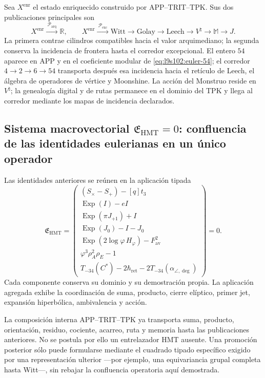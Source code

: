Sea \(X^{\mathrm{enr}}\) el estado enriquecido construido por
APP--TRIT--TPK. Sus dos publicaciones principales son
\begin{equation}
 X^{\mathrm{enr}}
 \xrightarrow{\ \mathcal P_{\mathrm{arq}}\ }\mathbb R,
 \qquad
 X^{\mathrm{enr}}
 \xrightarrow{\ \mathcal P_{\mathrm{exc}}\ }
 \mathrm{Witt}\to\mathrm{Golay}\to\mathrm{Leech}
 \to V^\natural\to\mathbb M\to J.
 \label{eq:l9s102:euler-doble-proyeccion}
\end{equation}
La primera contrae cilindros compatibles hacia el valor arquimediano; la
segunda conserva la incidencia de frontera hasta el corredor excepcional.
El entero \(54\) aparece en APP y en el coeficiente modular de
\cref{eq:l9s102:euler-54}; el corredor \(4\to2\to6\to54\) transporta
después esa incidencia hacia el retículo de Leech, el álgebra de operadores
de vértice y Moonshine. La acción del Monstruo reside en
\(V^\natural\); la genealogía digital y de rutas permanece en el dominio
del TPK y llega al corredor mediante los mapas de incidencia declarados.

\subsection{Sistema macrovectorial \texorpdfstring{\(\mathfrak E_{\mathrm{HMT}}=0\)}{E_HMT=0}: confluencia de las identidades eulerianas en un único operador}
\label{sec:l9s102:euler-macrovector}

Las identidades anteriores se reúnen en la aplicación tipada
\begin{equation}
 \boxed{
 \mathfrak E_{\mathrm{HMT}}=
 \begin{pmatrix}
 (S_\times-S_+)-[q]t_3\\[1mm]
 \operatorname{Exp}(I)-eI\\
 \operatorname{Exp}(\pi J_{+1})+I\\
 \operatorname{Exp}(J_0)-I-J_0\\
 \operatorname{Exp}(2\log\varphi\,H_\varphi)-F_{\mathrm{av}}^2\\
 \varphi^3\rho_A^2\rho_E-1\\
 T_{-34}(C^*)-2\hbar_{\mathrm{ret}}
 -2T_{-34}(\alpha_{\angle,\deg})
 \end{pmatrix}=0.}
 \label{eq:l9s102:euler-macrovector}
\end{equation}
Cada componente conserva su dominio y su demostración propia. La aplicación
agregada exhibe la coordinación de suma, producto, cierre elíptico, primer
jet, expansión hiperbólica, ambivalencia y acción.

La composición interna APP--TRIT--TPK ya transporta suma, producto,
orientación, residuo, cociente, acarreo, ruta y memoria hasta las
publicaciones anteriores. No se postula por ello un entrelazador HMT
ausente. Una promoción posterior sólo puede formularse mediante el cuadrado
tipado específico exigido por una representación ulterior ---por ejemplo,
una equivariancia grupal completa hasta Witt---, sin rebajar la confluencia
operatoria aquí demostrada.
